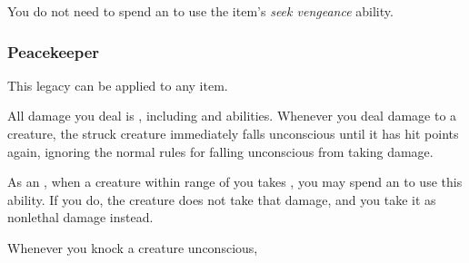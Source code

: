              You do not need to spend an  to use the item's \textit{seek vengeance} ability.


        \subsubsection{Peacekeeper}

            This legacy can be applied to any item.

             All damage you deal is , including  and  abilities.
            Whenever you deal damage to a \disabled creature, the struck creature immediately falls unconscious until it has hit points again, ignoring the normal rules for falling unconscious from taking damage.

             As an , when a creature within \rngmed range of you takes , you may spend an  to use this ability.
            If you do, the creature does not take that damage, and you take it as nonlethal damage instead.

             Whenever you knock a creature unconscious,
